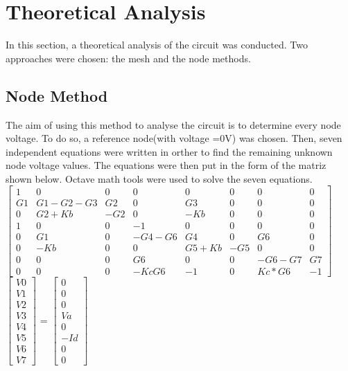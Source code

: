 

\section {Theoretical Analysis}
\label{analysis}

In this section, a theoretical analysis of the circuit was conducted. Two approaches were chosen: the mesh and the node methods.

\subsection{Node Method}

The aim of using this method to analyse the circuit is to determine every node voltage. To do so, a reference node(with voltage =0V) was chosen. Then, seven independent equations were written in orther to find the remaining unknown node voltage values. The equations were then put in the form of the matriz shown below. Octave math tools were used to solve the seven equations.\\

$\begin{bmatrix}
1 & 0 & 0 & 0 & 0 & 0 & 0 & 0\\
G1 & G1-G2-G3 & G2 & 0 & G3 & 0 & 0 & 0\\
0 & G2+Kb & -G2 & 0 & -Kb & 0 & 0 & 0\\
1 & 0 & 0 & -1 & 0 & 0 & 0 & 0\\
0 & G1 & 0 & -G4-G6 & G4 & 0 & G6 & 0\\
0 & -Kb & 0 & 0 & G5+Kb & -G5 & 0 & 0\\
0 & 0 & 0 & G6 & 0 & 0 & -G6-G7 & G7\\
0 & 0 & 0 & -KcG6 & -1 & 0 & Kc*G6 & -1
\end{bmatrix}$
$\begin{bmatrix}
V0 \\ V1 \\ V2 \\ V3 \\ V4 \\ V5 \\ V6 \\ V7
\end{bmatrix}$
= 
$\begin{bmatrix}
0 \\ 0 \\ 0 \\ Va \\ 0 \\ -Id \\ 0 \\ 0
\end{bmatrix}$



